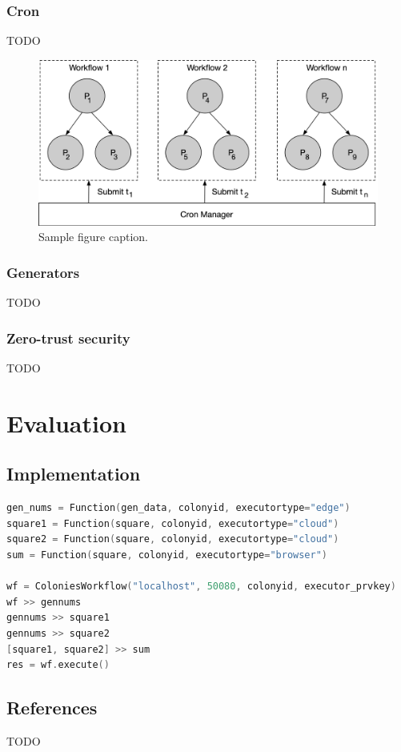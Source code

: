 \documentclass{article}
\begin{document}
\subsubsection{Cron}
TODO
\begin{figure}[h]
	\centering
    \includegraphics[scale=0.4]{cron.png}
	\caption{Sample figure caption.}
	\label{fig:fig1}
\end{figure}

\subsubsection{Generators}
TODO

\subsubsection{Zero-trust security}
TODO

\section{Evaluation}
\subsection{Implementation}
\begin{lstlisting}[language=c]
gen_nums = Function(gen_data, colonyid, executortype="edge")
square1 = Function(square, colonyid, executortype="cloud")
square2 = Function(square, colonyid, executortype="cloud")
sum = Function(square, colonyid, executortype="browser")

wf = ColoniesWorkflow("localhost", 50080, colonyid, executor_prvkey)
wf >> gennums
gennums >> square1
gennums >> square2
[square1, square2] >> sum
res = wf.execute()
\end{lstlisting}

\subsection{References}
TODO

\end{document}
